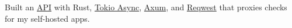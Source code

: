 {Built an \href{https://status.sachiniyer.com}{API} with Rust, \href{https://tokio.rs/tokio/tutorial/async}{Tokio Async}, \href{https://docs.rs/axum/latest/axum/}{Axum}, and \href{https://docs.rs/reqwest/latest/reqwest/}{Reqwest} that proxies checks for my self-hosted apps.}
